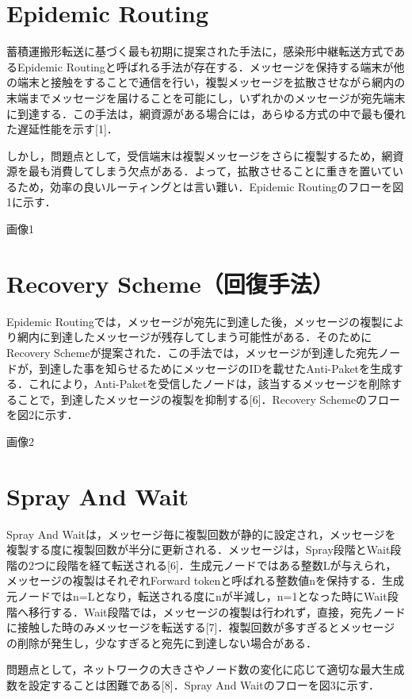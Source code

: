 \documentclass[11pt]{icsthesis}
\begin{document}
\section{Epidemic Routing}
蓄積運搬形転送に基づく最も初期に提案された手法に，感染形中継転送方式であるEpidemic Routingと呼ばれる手法が存在する．メッセージを保持する端末が他の端末と接触をすることで通信を行い，複製メッセージを拡散させながら網内の末端までメッセージを届けることを可能にし，いずれかのメッセージが宛先端末に到達する．この手法は，網資源がある場合には，あらゆる方式の中で最も優れた遅延性能を示す[1]．

しかし，問題点として，受信端末は複製メッセージをさらに複製するため，網資源を最も消費してしまう欠点がある．よって，拡散させることに重きを置いているため，効率の良いルーティングとは言い難い．Epidemic Routingのフローを図1に示す．

画像1

\section{Recovery Scheme（回復手法）}
Epidemic Routingでは，メッセージが宛先に到達した後，メッセージの複製により網内に到達したメッセージが残存してしまう可能性がある．そのためにRecovery Schemeが提案された．この手法では，メッセージが到達した宛先ノードが，到達した事を知らせるためにメッセージのIDを載せたAnti-Paketを生成する．これにより，Anti-Paketを受信したノードは，該当するメッセージを削除することで，到達したメッセージの複製を抑制する[6]．Recovery Schemeのフローを図2に示す．

画像2

\section{Spray And Wait}
Spray And Waitは，メッセージ毎に複製回数が静的に設定され，メッセージを複製する度に複製回数が半分に更新される．メッセージは，Spray段階とWait段階の2つに段階を経て転送される[6]．生成元ノードではある整数Lが与えられ，メッセージの複製はそれぞれForward tokenと呼ばれる整数値nを保持する．生成元ノードではn=Lとなり，転送される度にnが半減し，n=1となった時にWait段階へ移行する．Wait段階では，メッセージの複製は行われず，直接，宛先ノードに接触した時のみメッセージを転送する[7]．複製回数が多すぎるとメッセージの削除が発生し，少なすぎると宛先に到達しない場合がある．

問題点として，ネットワークの大きさやノード数の変化に応じて適切な最大生成数を設定することは困難である[8]．Spray And Waitのフローを図3に示す．
\end{document}
